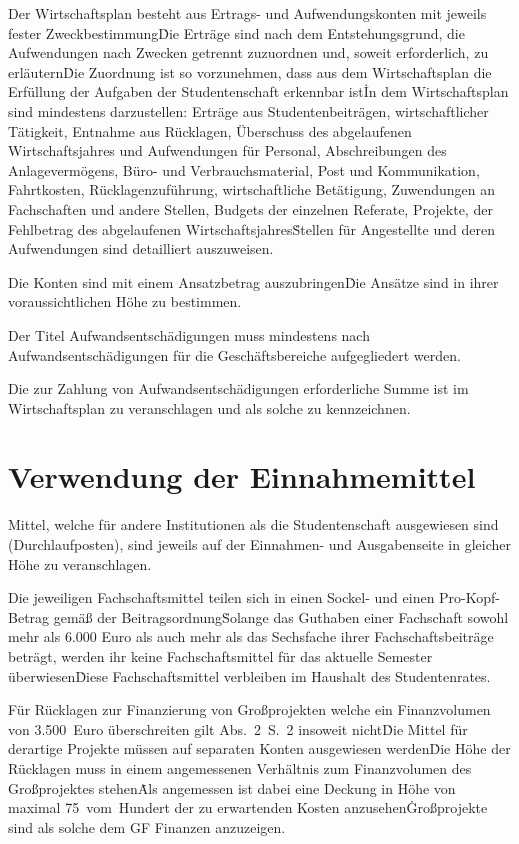 {\begin{multicols}{2}
\Abs \Satz Der Wirtschaftsplan besteht aus Ertrags- und Aufwendungskonten mit jeweils fester Zweckbestimmung\. Die Erträge sind nach dem Entstehungsgrund, die Aufwendungen nach Zwecken getrennt zuzuordnen und, soweit erforderlich, zu erläutern\. Die Zuordnung ist so vorzunehmen, dass aus dem Wirtschaftsplan die Erfüllung der Aufgaben der Studentenschaft erkennbar ist\. In dem Wirtschaftsplan sind mindestens darzustellen: Erträge aus Studentenbeiträgen, wirtschaftlicher Tätigkeit, Entnahme aus Rücklagen, Überschuss des abgelaufenen Wirtschaftsjahres und Aufwendungen für Personal, Abschreibungen des Anlagevermögens, Büro- und Verbrauchsmaterial, Post und Kommunikation, Fahrtkosten, Rücklagenzuführung, wirtschaftliche Betätigung, Zuwendungen an Fachschaften und andere Stellen, Budgets der einzelnen Referate, Projekte, der Fehlbetrag des abgelaufenen Wirtschaftsjahres\. Stellen für Angestellte und deren Aufwendungen sind detailliert auszuweisen.

\Abs \Satz Die Konten sind mit einem Ansatzbetrag auszubringen\. Die Ansätze sind in ihrer voraussichtlichen Höhe zu bestimmen.

\Abs \Satz Der Titel Aufwandsentschädigungen muss mindestens nach Aufwandsentschädigungen für die Geschäftsbereiche aufgegliedert werden.

\Abs \Satz Die zur Zahlung von Aufwandsentschädigungen erforderliche Summe ist im Wirtschaftsplan zu veranschlagen und als solche zu kennzeichnen.



\section{Verwendung der Einnahmemittel}

\Abs \Satz Mittel, welche für andere Institutionen als die Studentenschaft ausgewiesen sind (Durchlaufposten), sind jeweils auf der Einnahmen- und Ausgabenseite in gleicher Höhe zu veranschlagen.

\Abs \Satz Die jeweiligen Fachschaftsmittel teilen sich in einen Sockel- und einen Pro-Kopf-Betrag gemäß der Beitragsordnung\. Solange das Guthaben einer Fachschaft sowohl mehr als 6.000 Euro als auch mehr als das Sechsfache ihrer Fachschaftsbeiträge beträgt, werden ihr keine Fachschaftsmittel für das aktuelle Semester überwiesen\. Diese Fachschaftsmittel verbleiben im Haushalt des Studentenrates.

\Abs \Satz Für Rücklagen zur Finanzierung von Großprojekten welche ein Finanzvolumen von 3.500~Euro überschreiten gilt Abs.~2~S.~2 insoweit nicht\. Die Mittel für derartige Projekte müssen auf separaten Konten ausgewiesen werden\. Die Höhe der Rücklagen muss in einem angemessenen Verhältnis zum Finanzvolumen des Großprojektes stehen\. Als angemessen ist dabei eine Deckung in Höhe von maximal 75~vom~Hundert der zu erwartenden Kosten anzusehen\. Großprojekte sind als solche dem GF Finanzen anzuzeigen.


\end{multicols}}
